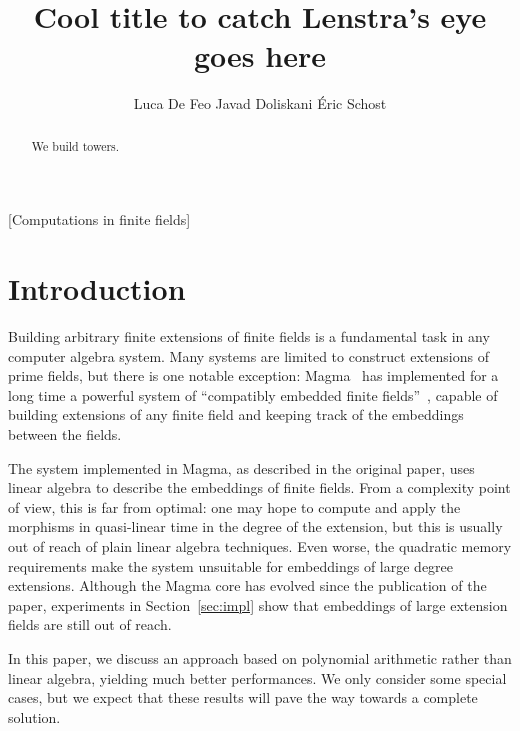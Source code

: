 \documentclass{sig-alternate}
\begin{document}
\title{Cool title to catch Lenstra's eye goes here}
\author{
  \alignauthor Luca De Feo
  \alignauthor Javad Doliskani
  \alignauthor \'Eric Schost
}

\maketitle
\begin{abstract}
  We build towers.
\end{abstract}
[Computations in finite fields]


\section{Introduction}
\label{sec:intro}

Building arbitrary finite extensions of finite fields is a fundamental
task in any computer algebra system. Many systems are limited to
construct extensions of prime fields, but there is one notable
exception: Magma~\cite{MAGMA} has implemented for a long time a
powerful system of ``compatibly embedded finite
fields''~\cite{bosma+cannon+steel97}, capable of building extensions
of any finite field and keeping track of the embeddings between the
fields.

The system implemented in Magma, as described in the original paper,
uses linear algebra to describe the embeddings of finite fields. From
a complexity point of view, this is far from optimal: one may hope to
compute and apply the morphisms in quasi-linear time in the degree of
the extension, but this is usually out of reach of plain linear
algebra techniques. Even worse, the quadratic memory requirements make
the system unsuitable for embeddings of large degree
extensions. Although the Magma core has evolved since the publication
of the paper, experiments in Section~\ref{sec:impl} show that
embeddings of large extension fields are still out of reach.

In this paper, we discuss an approach based on polynomial arithmetic
rather than linear algebra, yielding much better performances. We only
consider some special cases, but we expect that these results will
pave the way towards a complete solution.
\end{document}
